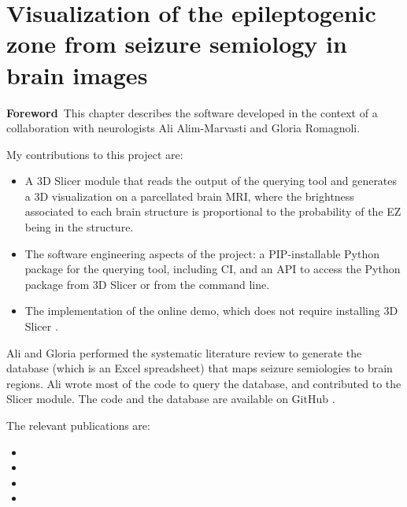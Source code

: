 \chapter[Visualization of the epileptogenic zone in brain images]{Visualization of the epileptogenic zone from seizure semiology in brain images}

\label{chap:svt}
\minitoc

\begin{center}
  \begin{minipage}[b]{0.9\linewidth}
    \small
    \textbf{Foreword\,}
    This chapter describes the software developed in the context of a collaboration with neurologists Ali Alim-Marvasti and Gloria Romagnoli.

    My contributions to this project are:
    \begin{itemize}
      \item A 3D Slicer module \cite{fedorov_3d_2012} that reads the output of the querying tool and generates a 3D visualization on a parcellated brain \ac{MRI}, where the brightness associated to each brain structure is proportional to the probability of the \ac{EZ} being in the structure.
      \item The software engineering aspects of the project: a \ac{PIP}-installable Python package for the querying tool, including \ac{CI}, and an \ac{API} to access the Python package from 3D Slicer or from the command line.
      \item The implementation of the online demo, which does not require installing 3D Slicer%
      .
    \end{itemize}

    Ali and Gloria performed the systematic literature review to generate the database (which is an Excel spreadsheet) that maps seizure semiologies to brain regions.
    Ali wrote most of the code to query the database, and contributed to the Slicer module.
    The code and the database are available on GitHub%
    \fnurl{\svtgithub}.

    The relevant publications are:
    \begin{itemize}
      \item {}
      \item {}
      \item {}
      \item {}
    \end{itemize}

  \end{minipage}
\end{center}

\acresetall
\bodyspacing





\onehalfspacing %
